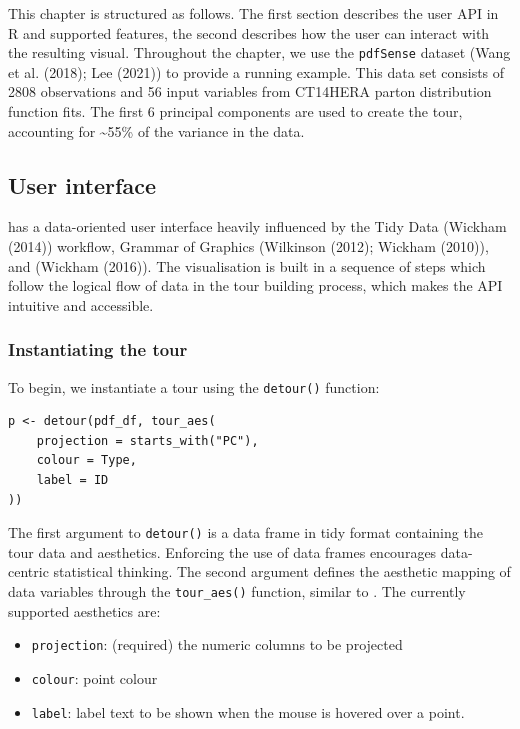 This chapter is structured as follows. The first section describes the user API in R and supported features, the second describes how the user can interact with the resulting visual. Throughout the chapter, we use the \texttt{pdfSense} dataset (Wang et al. (2018); Lee (2021)) to provide a running example. This data set consists of 2808 observations and 56 input variables from CT14HERA parton distribution function fits. The first 6 principal components are used to create the tour, accounting for \textasciitilde55\% of the variance in the data.

\hypertarget{user-interface}{%
\subsection{User interface}\label{user-interface}}

 has a data-oriented user interface heavily influenced by the Tidy Data (Wickham (2014)) workflow, Grammar of Graphics (Wilkinson (2012); Wickham (2010)), and  (Wickham (2016)). The visualisation is built in a sequence of steps which follow the logical flow of data in the tour building process, which makes the API intuitive and accessible.

\hypertarget{instantiating-the-tour}{%
\subsubsection{Instantiating the tour}\label{instantiating-the-tour}}

To begin, we instantiate a tour using the \texttt{detour()} function:

\begin{verbatim}
p <- detour(pdf_df, tour_aes(
    projection = starts_with("PC"),
    colour = Type,
    label = ID
))
\end{verbatim}

The first argument to \texttt{detour()} is a data frame in tidy format containing the tour data and aesthetics. Enforcing the use of data frames encourages data-centric statistical thinking. The second argument defines the aesthetic mapping of data variables through the \texttt{tour\_aes()} function, similar to . The currently supported aesthetics are:

\begin{itemize}
\tightlist
\item
  \texttt{projection}: (required) the numeric columns to be projected
\item
  \texttt{colour}: point colour
\item
  \texttt{label}: label text to be shown when the mouse is hovered over a point.
\end{itemize}

